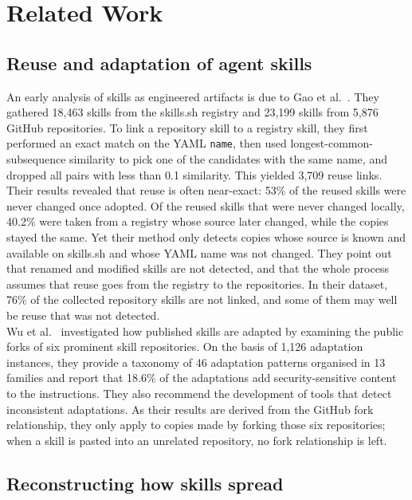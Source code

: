 \documentclass[sigconf,screen]{acmart}
\begin{document}
\section{Related Work}
\label{Section:RelatedWork}

\subsection{Reuse and adaptation of agent skills}

An early analysis of skills as engineered artifacts is due to Gao et al.~\cite{gao2026registry}. They gathered 18,463 skills from the skills.sh registry and 23,199 skills from 5,876 GitHub repositories. To link a repository skill to a registry skill, they first performed an exact match on the YAML \texttt{name}, then used longest-common-subsequence similarity to pick one of the candidates with the same name, and dropped all pairs with less than 0.1 similarity. This yielded 3,709 reuse links. Their results revealed that reuse is often near-exact: 53\% of the reused skills were never changed once adopted. Of the reused skills that were never changed locally, 40.2\% were taken from a registry whose source later changed, while the copies stayed the same. Yet their method only detects copies whose source is known and available on skills.sh and whose YAML name was not changed. They point out that renamed and modified skills are not detected, and that the whole process assumes that reuse goes from the registry to the repositories. In their dataset, 76\% of the collected repository skills are not linked, and some of them may well be reuse that was not detected. \\
Wu et al.~\cite{wu2026adaptation} investigated how published skills are adapted by examining the public forks of six prominent skill repositories. On the basis of 1,126 adaptation instances, they provide a taxonomy of 46 adaptation patterns organised in 13 families and report that 18.6\% of the adaptations add security-sensitive content to the instructions. They also recommend the development of tools that detect inconsistent adaptations. As their results are derived from the GitHub fork relationship, they only apply to copies made by forking those six repositories; when a skill is pasted into an unrelated repository, no fork relationship is left.

\subsection{Reconstructing how skills spread}
\end{document}
